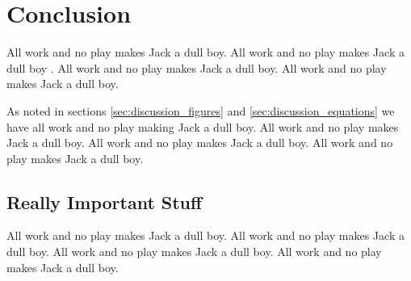 
%
%

%
%

\section{Conclusion}
\label{sec:conclusion}

All work and no play makes Jack a dull boy.
All work and no play makes Jack a dull boy \cite{knuth-website}.
All work and no play makes Jack a dull boy.
All work and no play makes Jack a dull boy.

As noted in sections
\ref{sec:discussion_figures} and
\ref{sec:discussion_equations}
we have all work and no play making Jack a dull boy.
All work and no play makes Jack a dull boy.
All work and no play makes Jack a dull boy.
All work and no play makes Jack a dull boy.

\subsection{Really Important Stuff}
\label{sec:conclusions_important_stuff}

All work and no play makes Jack a dull boy.
All work and no play makes Jack a dull boy.
All work and no play makes Jack a dull boy.
All work and no play makes Jack a dull boy.
